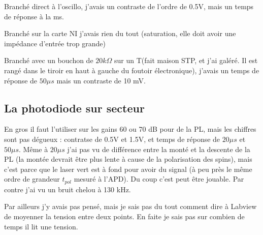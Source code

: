 \documentclass[a4paper]{report}
\begin{document}
  Branché direct à l'oscillo, j'avais un contraste de l'ordre de 0.5V, mais un temps de réponse à la ms.
  
  Branché sur la carte NI j'avais rien du tout (saturation, elle doit avoir une impédance d'entrée trop grande)
  
  Branché avec un bouchon de $20 k\Omega$ sur un T(fait maison STP, et j'ai galéré. Il est rangé dans le tiroir en haut à gauche du foutoir électronique), j'avais un temps de réponse de $50 \mu s$ mais un contraste de 10 mV.
  
 \subsection{La photodiode sur secteur}
 En gros il faut l'utiliser sur les gains 60 ou 70 dB pour de la PL, mais les chiffres sont pas dégueux : contratse de 0.5V et 1.5V, et temps de réponse de $20 \mu s$ et $50 \mu s$. Même à $20 \mu s$ j'ai pas vu de différence entre la monté et la descente de la PL (la montée devrait être plus lente à cause de la polarisation des spins), mais c'est parce que le laser vert est à fond pour avoir du signal (à peu près le même ordre de grandeur $t_{pol}$ mesuré à l'APD).
 Du coup c'est peut être jouable. Par contre j'ai vu un bruit chelou à 130 kHz.
 
 Par ailleurs j'y avais pas pensé, mais je sais pas du tout comment dire à Labview de moyenner la tension entre deux points. En faite je sais pas sur combien de temps il lit une tension.
 
  
\end{document}
